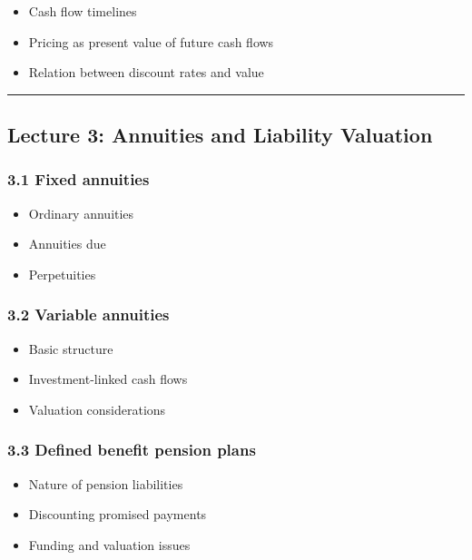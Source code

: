 \documentclass[
  letterpaper,
  DIV=11,
  numbers=noendperiod]{scrartcl}
\providecommand{\tightlist}{%
  \setlength{\itemsep}{0pt}\setlength{\parskip}{0pt}}
\begin{document}
\begin{itemize}
\tightlist
\item
  Cash flow timelines
\item
  Pricing as present value of future cash flows
\item
  Relation between discount rates and value
\end{itemize}

\begin{center}\rule{0.5\linewidth}{0.5pt}\end{center}

\subsection{Lecture 3: Annuities and Liability
Valuation}\label{lecture-3-annuities-and-liability-valuation}

\subsubsection{3.1 Fixed annuities}\label{fixed-annuities}

\begin{itemize}
\tightlist
\item
  Ordinary annuities
\item
  Annuities due
\item
  Perpetuities
\end{itemize}

\subsubsection{3.2 Variable annuities}\label{variable-annuities}

\begin{itemize}
\tightlist
\item
  Basic structure
\item
  Investment-linked cash flows
\item
  Valuation considerations
\end{itemize}

\subsubsection{3.3 Defined benefit pension
plans}\label{defined-benefit-pension-plans}

\begin{itemize}
\tightlist
\item
  Nature of pension liabilities
\item
  Discounting promised payments
\item
  Funding and valuation issues
\end{itemize}
\end{document}
